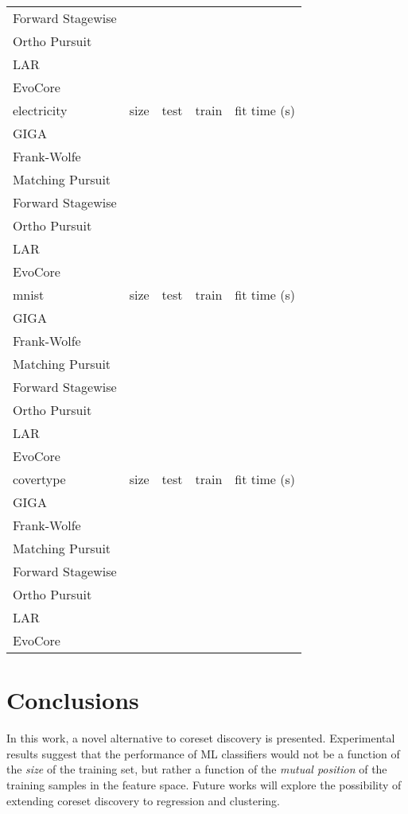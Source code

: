 \documentclass{article}
\begin{document}
\begin{table}[!ht]
\begin{center}
\begin{small}
\begin{sc}
{\begin{tabular}{@{}lllll@{}}
Forward Stagewise &  &  &  &  \\
Ortho Pursuit & \bm{} &  &  & \bm{} \\
LAR &  &  &  &  \\
EvoCore &  & \bm{} &  &  \\
\midrule
electricity & size & test   & train   & fit time (s) \\ \midrule
GIGA &  &  &  &  \\
Frank-Wolfe &  &  &  &  \\
Matching Pursuit &  &  &  &  \\
Forward Stagewise &  &  &  &  \\
Ortho Pursuit & \bm{} &  &  & \bm{} \\
LAR &  &  &  &  \\
EvoCore &  & \bm{} &  &  \\
\midrule
mnist & size & test   & train   & fit time (s) \\ \midrule
GIGA &  &  &  & \bm{} \\
Frank-Wolfe &  & \bm{} &  &  \\
Matching Pursuit &  &  &  &  \\
Forward Stagewise &  &  &  &  \\
Ortho Pursuit &  &  &  &  \\
LAR &  &  &  &  \\
EvoCore & \bm{} &  &  &  \\
\midrule
covertype & size & test   & train   & fit time (s) \\ \midrule
GIGA &  &  &  &  \\
Frank-Wolfe &  &  &  &  \\
Matching Pursuit &  &  &  &  \\
Forward Stagewise &  &  &  &  \\
Ortho Pursuit & \bm{} &  &  &  \\
LAR &  &  &  &  \\
EvoCore &  & \bm{} &  &  \\
\bottomrule
\end{tabular}}
\end{sc}
\end{small}
\end{center}
\vskip -0.1in
\end{table}


\section{Conclusions}
\label{sec:conclusions}
In this work, a novel alternative to coreset discovery is presented. 
Experimental results suggest that the performance of ML classifiers would not be a function of the \textit{size} of the training set, but rather a function of the \textit{mutual position} of the training samples in the feature space. 
Future works will explore the possibility of extending coreset discovery to regression and clustering.
\end{document}
